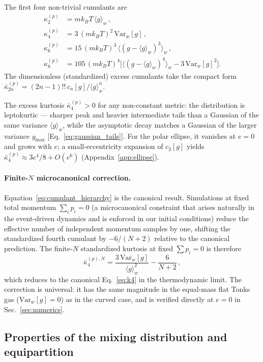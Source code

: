 \documentclass[aps,pre,twocolumn,superscriptaddress,longbibliography,floatfix]{revtex4-2}
\begin{document}
The first four non-trivial cumulants are
\begin{align}
  \kappa_2^{(p)} &= mk_BT\,\langle g\rangle_w\,,\label{eq:k2}\\
  \kappa_4^{(p)} &= 3\,(mk_BT)^2\,\mathrm{Var}_w[g]\,,\label{eq:k4}\\
  \kappa_6^{(p)} &= 15\,(mk_BT)^3\,\langle(g-\langle g\rangle_w)^3\rangle_w\,,\label{eq:k6}\\
  \kappa_8^{(p)} &= 105\,(mk_BT)^4\bigl[\langle(g-\langle g\rangle_w)^4\rangle_w
                    - 3\,\mathrm{Var}_w[g]^2\bigr].\label{eq:k8}
\end{align}
The dimensionless (standardized) excess cumulants take the compact form
$\bar\kappa_{2n}^{(p)} = (2n-1)!!\,c_n[g]/\langle g\rangle_w^n$.

The excess kurtosis $\bar\kappa_4^{(p)}>0$ for any non-constant metric: the distribution is
leptokurtic — sharper peak and heavier intermediate tails than a Gaussian of the same
variance $\langle g\rangle_w$, while the asymptotic decay matches a Gaussian of the larger
variance $g_{\max}$ [Eq.~\eqref{eq:gaussian_tails}].
For the polar ellipse, it vanishes at $e=0$ and grows with $e$; a small-eccentricity expansion
of $c_2[g]$ yields $\bar\kappa_4^{(p)}\approx 3e^4/8+O(e^6)$ (Appendix~\ref{app:ellipse}).

\paragraph*{Finite-$N$ microcanonical correction.}
Equation~\eqref{eq:cumulant_hierarchy} is the canonical result.
Simulations at fixed total momentum $\sum_i p_i = 0$ (a microcanonical constraint
that arises naturally in the event-driven dynamics and is enforced in our
initial conditions) reduce the effective number of independent momentum samples by one,
shifting the standardized fourth cumulant by $-6/(N+2)$ relative to the canonical
prediction. The finite-$N$ standardized kurtosis at fixed $\sum p_i=0$ is therefore
\begin{equation}
  \bar\kappa_4^{(p),N} = \frac{3\,\mathrm{Var}_w[g]}{\langle g\rangle_w^2} - \frac{6}{N+2}\,,
  \label{eq:k4_finiteN}
\end{equation}
which reduces to the canonical Eq.~\eqref{eq:k4} in the thermodynamic limit. The
correction is universal: it has the same magnitude in the equal-mass flat Tonks gas
($\mathrm{Var}_w[g]=0$) as in the curved case, and is verified directly at $e=0$ in
Sec.~\ref{sec:numerics}.

\subsection{Properties of the mixing distribution and equipartition}
\label{sec:class}
\end{document}
